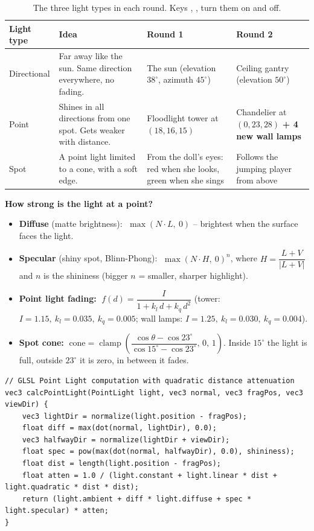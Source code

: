\documentclass[11pt,a4paper]{article}
\newcommand{\keybox}[1]{\colorbox{rowgray}{\ttfamily #1}}
\begin{document}
\begin{table}[H]
\centering\small
{}
\begin{tabularx}{\linewidth}{p{2.4cm} L L L}
\toprule
{}\textbf{Light type} & \textbf{Idea} & \textbf{Round 1} & \textbf{Round 2} \\ \midrule
Directional & Far away like the sun. Same direction everywhere, no fading. & The sun (elevation $38^\circ$, azimuth $45^\circ$) & Ceiling gantry (elevation $50^\circ$) \\
Point & Shines in all directions from one spot. Gets weaker with distance. & Floodlight tower at $(18,16,15)$ & Chandelier at $(0,23,28)$ \textbf{+ 4 new wall lamps} \\
Spot & A point light limited to a cone, with a soft edge. & From the doll's eyes: red when she looks, green when she sings & Follows the jumping player from above \\
\bottomrule
\end{tabularx}
\caption{The three light types in each round. Keys \keybox{0}, \keybox{8}, \keybox{9} turn them on and off.}
\end{table}

\textbf{How strong is the light at a point?}

\begin{itemize}
  \item \textbf{Diffuse} (matte brightness): $\;\max(N\cdot L,\ 0)$ -- brightest when the surface faces the light.
  \item \textbf{Specular} (shiny spot, Blinn-Phong): $\;\max(N\cdot H,\ 0)^{n}$, where $H=\dfrac{L+V}{|L+V|}$ and
        $n$ is the shininess (bigger $n$ = smaller, sharper highlight).
  \item \textbf{Point light fading:} $\;f(d)=\dfrac{I}{1+k_l\,d+k_q\,d^2}$ \quad
        (tower: $I{=}1.15,\ k_l{=}0.035,\ k_q{=}0.005$; wall lamps: $I{=}1.25,\ k_l{=}0.030,\ k_q{=}0.004$).
  \item \textbf{Spot cone:} $\;\text{cone}=\operatorname{clamp}\!\left(\dfrac{\cos\theta-\cos23^\circ}{\cos15^\circ-\cos23^\circ},\,0,\,1\right)$.
        Inside $15^\circ$ the light is full, outside $23^\circ$ it is zero, in between it fades.
\end{itemize}

\begin{lstlisting}
// GLSL Point Light computation with quadratic distance attenuation
vec3 calcPointLight(PointLight light, vec3 normal, vec3 fragPos, vec3 viewDir) {
    vec3 lightDir = normalize(light.position - fragPos);
    float diff = max(dot(normal, lightDir), 0.0);
    vec3 halfwayDir = normalize(lightDir + viewDir);
    float spec = pow(max(dot(normal, halfwayDir), 0.0), shininess);
    float dist = length(light.position - fragPos);
    float atten = 1.0 / (light.constant + light.linear * dist + light.quadratic * dist * dist);
    return (light.ambient + diff * light.diffuse + spec * light.specular) * atten;
}
\end{lstlisting}
\end{document}
